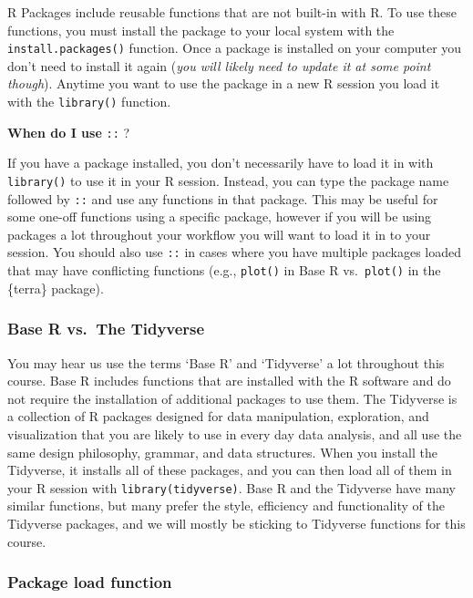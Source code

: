 \documentclass[
]{book}
\begin{document}
R Packages include reusable functions that are not built-in with R. To use these functions, you must install the package to your local system with the \texttt{install.packages()} function. Once a package is installed on your computer you don't need to install it again (\emph{you will likely need to update it at some point though}). Anytime you want to use the package in a new R session you load it with the \texttt{library()} function.

\textbf{When do I use} \texttt{::} ?

If you have a package installed, you don't necessarily have to load it in with \texttt{library()} to use it in your R session. Instead, you can type the package name followed by \texttt{::} and use any functions in that package. This may be useful for some one-off functions using a specific package, however if you will be using packages a lot throughout your workflow you will want to load it in to your session. You should also use \texttt{::} in cases where you have multiple packages loaded that may have conflicting functions (e.g., \texttt{plot()} in Base R vs.~\texttt{plot()} in the \{terra\} package).

\hypertarget{base-r-vs.-the-tidyverse}{%
\subsubsection{Base R vs.~The Tidyverse}\label{base-r-vs.-the-tidyverse}}

You may hear us use the terms `Base R' and `Tidyverse' a lot throughout this course. Base R includes functions that are installed with the R software and do not require the installation of additional packages to use them. The Tidyverse is a collection of R packages designed for data manipulation, exploration, and visualization that you are likely to use in every day data analysis, and all use the same design philosophy, grammar, and data structures. When you install the Tidyverse, it installs all of these packages, and you can then load all of them in your R session with \texttt{library(tidyverse)}. Base R and the Tidyverse have many similar functions, but many prefer the style, efficiency and functionality of the Tidyverse packages, and we will mostly be sticking to Tidyverse functions for this course.

\hypertarget{package-load-function}{%
\subsubsection{Package load function}\label{package-load-function}}
\end{document}
